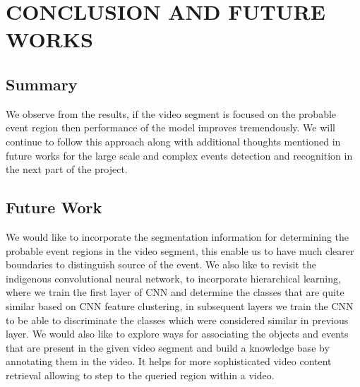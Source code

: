 \chapter{CONCLUSION AND FUTURE WORKS}
 \label{chap:concl}
 \section{Summary}
 We observe from the results, if the video segment is focused on the probable event region then performance of the model improves tremendously. We will continue to follow this approach along with additional thoughts mentioned in future works for the large scale and complex events detection and recognition in the next part of the project.
 \section{Future Work}
 We would  like to incorporate the segmentation information for determining the probable event regions in the video segment, this enable us to have much clearer boundaries to distinguish source of the event. We also like to revisit the indigenous convolutional neural network, to incorporate hierarchical learning, where we train the first layer of CNN and determine the classes that are quite similar based on CNN feature clustering, in subsequent layers we train the CNN to be able to discriminate the classes which were considered similar in previous layer. We would also like to explore ways for associating the objects and events that are present in the given video segment and build a knowledge base by annotating them in the video. It helps for more sophisticated video content retrieval allowing to step to the queried region within a video.